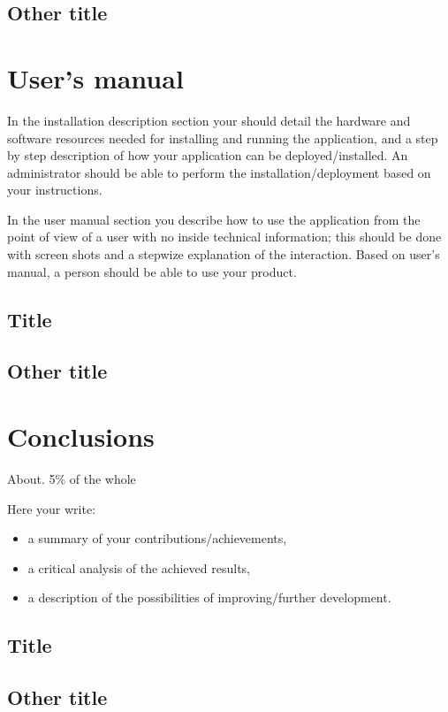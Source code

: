 \documentclass[12pt,a4paper,twoside]{report}
\begin{document}
\section{Other title}

\chapter{User's manual}

In the installation description section your should detail the hardware and software resources needed for installing and running the application, and a step by step description of how your application can be deployed/installed. An administrator should be able to perform the installation/deployment based on your instructions.

In the user manual section you describe how to use the application from the point of view of a user with no inside technical information; this should be done with screen shots and a stepwize explanation of the interaction. Based on user's manual, a person should be able to use your product.

\section{Title}
\section{Other title}

\chapter{Conclusions}

About. 5\% of the whole

Here your write:
\begin{itemize}
\item a summary of your contributions/achievements,
\item a critical analysis of the achieved results,
\item a description of the possibilities of improving/further development.
\end{itemize}
\section{Title}
\section{Other title}


 


\end{document}
